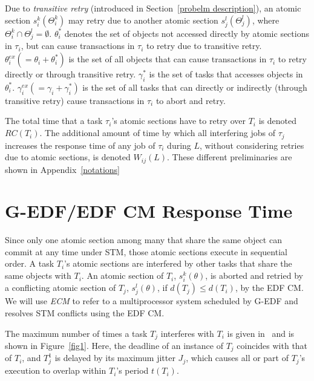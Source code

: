 \documentclass[a4paper,english]{article}
\begin{document}
Due to \textit{transitive retry} (introduced in Section~\ref{probelm description}), an atomic section $s_i^k(\Theta_i^k)$ may retry due to another atomic section $s_j^l(\Theta_j^l)$, where $\Theta_i^k \cap \Theta_j^l = \emptyset$. $\theta_i^*$ denotes the set of objects not accessed directly by atomic sections in $\tau_i$, but can cause transactions in $\tau_i$ to retry due to transitive retry. $\theta_i^{ex}(=\theta_i + \theta_i^*)$ is the set of all objects that can cause transactions in $\tau_i$ to retry directly or through transitive retry. $\gamma_i^*$ is the set of tasks that accesses  objects in $\theta_i^*$. $\gamma_i^{ex}(=\gamma_i + \gamma_i^*)$ is the set of all tasks that can directly or indirectly (through transitive retry) cause transactions in $\tau_i$ to abort and retry.

The total time that a task $\tau_i$'s atomic sections have to retry over $T_i$ is denoted $RC(T_i)$. The additional amount of time by which all interfering jobs of $\tau_j$ increases the response time of any job of $\tau_i$ during $L$, without considering retries due to atomic sections, is denoted $W_{ij}(L)$. These different preliminaries are shown in Appendix~\ref{notations}

\section{G-EDF/EDF CM Response Time}
\label{sec:g-edf-edf-cm}

Since only one atomic section among many that share the same object can commit at any time under STM, those atomic sections execute in sequential order.  A task $T_{i}$'s atomic sections are interfered by other tasks that share the same objects with $T_{i}$. An atomic section of $T_i$, $s_i^k(\theta)$, is aborted and retried by a conflicting atomic section of $T_j$, $s_j^l(\theta)$, if $d(T_j) \le d(T_i)$, by the EDF CM. We will use \emph{ECM} to refer to a multiprocessor system scheduled by G-EDF and resolves STM conflicts using the EDF CM. 



The maximum number of times a task $T_{j}$ interferes with $T_{i}$ is given in~\cite{key-2} and is shown in Figure~\ref{fig1}. 
Here, the deadline of an instance of $T_{j}$ coincides
with that of $T_{i}$, and $T_{j}^{1}$ is delayed by its maximum
jitter $J_{j}$, which causes all or part of $T_{j}$'s execution to overlap within $T_{i}$'s period $t(T_i)$.
\end{document}
